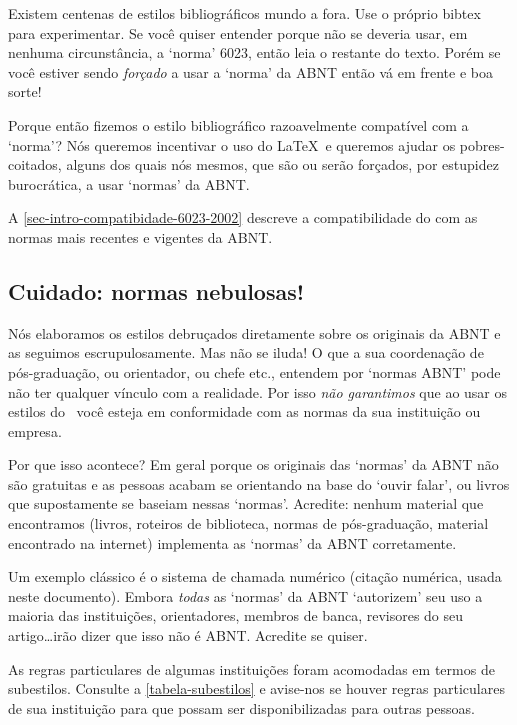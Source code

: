 \documentclass[a4paper]{ltxdoc}
\begin{document}
Existem centenas de estilos bibliográficos mundo a fora. Use o próprio
\textsf{bibtex} para experimentar. Se você quiser entender porque não se deveria
usar, em nenhuma circunstância, a `norma' 6023, então leia o restante do texto.
Porém se você estiver sendo \emph{forçado} a usar a `norma' da ABNT então vá em
frente e boa sorte!

Porque então fizemos o estilo bibliográfico razoavelmente compatível com a
`norma'? Nós queremos incentivar o uso do \LaTeX\  e queremos ajudar os
pobres-coitados, alguns dos quais nós mesmos, que são ou serão forçados, por
estupidez burocrática, a usar `normas' da ABNT.

A \autoref{sec-intro-compatibidade-6023-2002} descreve a compatibilidade do
 com as normas mais recentes e vigentes da ABNT.

\subsection{Cuidado: normas nebulosas!}

Nós elaboramos os estilos debruçados diretamente sobre os originais da ABNT
e as seguimos escrupulosamente. Mas não se iluda! O que a sua coordenação
de pós-graduação, ou orientador, ou chefe etc., entendem por `normas ABNT'
pode não ter qualquer vínculo com a realidade. Por isso \emph{não garantimos}
que ao usar os estilos do \abnTeX\ você esteja em conformidade com as normas
da sua instituição ou empresa.

Por que isso acontece? Em geral porque os originais das `normas' da ABNT não
são gratuitas e as pessoas acabam se orientando na base do
`ouvir falar', ou livros que supostamente se baseiam nessas `normas'.
Acredite: nenhum material que encontramos (livros, roteiros de biblioteca,
normas de pós-graduação, material encontrado na internet) implementa
as `normas' da ABNT corretamente.

Um exemplo clássico é o sistema de chamada numérico (citação numérica, usada
neste documento). Embora \emph{todas} as `normas' da
ABNT\cite{NBR6023:2000,NBR6023:2002,NBR10520:1988,NBR10520:2001} `autorizem' seu
uso a maioria das instituições, orientadores, membros de banca, revisores do seu
artigo\ldots irão dizer que isso não é ABNT. Acredite se quiser.

As regras particulares de algumas instituições foram acomodadas em termos de
subestilos. Consulte a \autoref{tabela-subestilos} e avise-nos se houver
regras particulares de sua instituição para que possam ser disponibilizadas
para outras pessoas.
\end{document}

